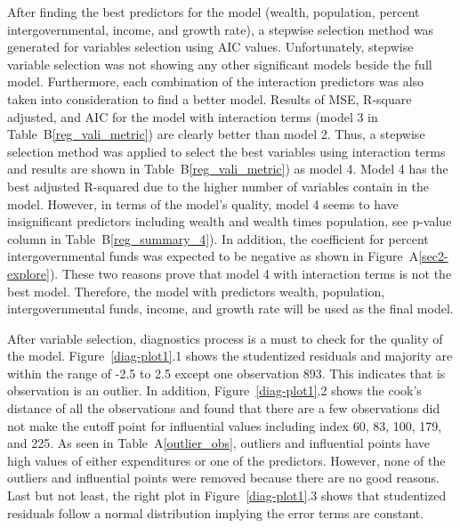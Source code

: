 \documentclass[11pt]{article}\usepackage[]{graphicx}\usepackage[]{color}
\begin{document}
\noindent After finding the best predictors for the model (wealth, population, percent intergovernmental, income, and growth rate), a stepwise selection method was generated for variables selection using AIC values. Unfortunately, stepwise variable selection was not showing any other significant models beside the full model. Furthermore, each combination of the interaction predictors was also taken into consideration to find a better model. Results of MSE, R-square adjusted, and AIC for the model with interaction terms (model 3 in Table~B\ref{reg_vali_metric}) are clearly better than model 2. Thus, a stepwise selection method was applied to select the best variables using interaction terms and results are shown in Table~B\ref{reg_vali_metric}) as model 4. Model 4 has the best adjusted R-squared due to the higher number of variables contain in the model. However, in terms of the model's quality, model 4 seems to have insignificant predictors including wealth and wealth times population, see p-value column in Table~B\ref{reg_summary_4}). In addition, the coefficient for percent intergovernmental funds was expected to be negative as shown in Figure~A\ref{sec2-explore}). These two reasons prove that model 4 with interaction terms is not the best model. Therefore, the model with predictors wealth, population, intergovernmental funds, income, and growth rate will be used as the final model.

\noindent After variable selection, diagnostics process is a must to check for the quality of the model. Figure~\ref{diag-plot1}.1 shows the studentized residuals and majority are within the range of -2.5 to 2.5 except one observation 893. This indicates that is observation is an outlier. In addition, Figure~\ref{diag-plot1}.2 shows the cook's distance of all the observations and found that there are a few observations did not make the cutoff point for influential values including index 60, 83, 100, 179, and 225. As seen in Table~A\ref{outlier_obs}, outliers and influential points have high values of either expenditures or one of the predictors. However, none of the outliers and influential points were removed because there are no good reasons. Last but not least, the right plot in Figure~\ref{diag-plot1}.3 shows that studentized residuals follow a normal distribution implying the error terms are constant.    
\end{document}

